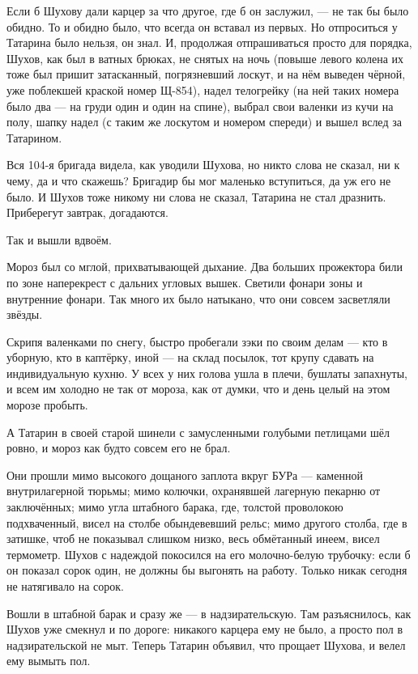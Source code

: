 Если б Шухову дали карцер за что другое, где б он заслужил, --- не так бы было обидно. То и обидно было, что всегда он вставал из первых. Но отпроситься у Татарина было нельзя, он знал. И, продолжая отпрашиваться просто для порядка, Шухов, как был в ватных брюках, не снятых на ночь (повыше левого колена их тоже был пришит затасканный, погрязневший лоскут, и на нём выведен чёрной, уже поблекшей краской номер Щ-854), надел телогрейку (на ней таких номера было два --- на груди один и один на спине), выбрал свои валенки из кучи на полу, шапку надел (с таким же лоскутом и номером спереди) и вышел вслед за Татарином.

Вся 104-я бригада видела, как уводили Шухова, но никто слова не сказал, ни к чему, да и что скажешь? Бригадир бы мог маленько вступиться, да уж его не было. И Шухов тоже никому ни слова не сказал, Татарина не стал дразнить. Приберегут завтрак, догадаются.

Так и вышли вдвоём.

Мороз был со мглой, прихватывающей дыхание. Два больших прожектора били по зоне наперекрест с дальних угловых вышек. Светили фонари зоны и внутренние фонари. Так много их было натыкано, что они совсем засветляли звёзды.

Скрипя валенками по снегу, быстро пробегали зэки по своим делам --- кто в уборную, кто в каптёрку, иной --- на склад посылок, тот крупу сдавать на индивидуальную кухню. У всех у них голова ушла в плечи, бушлаты запахнуты, и всем им холодно не так от мороза, как от думки, что и день целый на этом морозе пробыть.

А Татарин в своей старой шинели с замусленными голубыми петлицами шёл ровно, и мороз как будто совсем его не брал.

Они прошли мимо высокого дощаного заплота вкруг БУРа --- каменной внутрилагерной тюрьмы; мимо колючки, охранявшей лагерную пекарню от заключённых; мимо угла штабного барака, где, толстой проволокою подхваченный, висел на столбе обындевевший рельс; мимо другого столба, где в затишке, чтоб не показывал слишком низко, весь обмётанный инеем, висел термометр. Шухов с надеждой покосился на его молочно-белую трубочку: если б он показал сорок один, не должны бы выгонять на работу. Только никак сегодня не натягивало на сорок.

Вошли в штабной барак и сразу же --- в надзирательскую. Там разъяснилось, как Шухов уже смекнул и по дороге: никакого карцера ему не было, а просто пол в надзирательской не мыт. Теперь Татарин объявил, что прощает Шухова, и велел ему вымыть пол.

